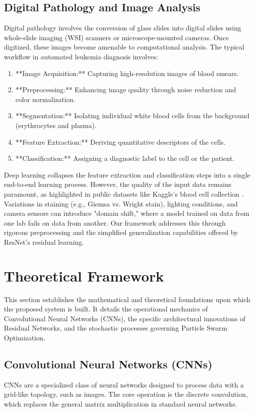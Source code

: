 \documentclass[journal]{IEEEtran}
\begin{document}
\subsection{Digital Pathology and Image Analysis}
Digital pathology involves the conversion of glass slides into digital slides using whole-slide imaging (WSI) scanners or microscope-mounted cameras. Once digitized, these images become amenable to computational analysis. The typical workflow in automated leukemia diagnosis involves:
\begin{enumerate}
    \item **Image Acquisition:** Capturing high-resolution images of blood smears.
    \item **Preprocessing:** Enhancing image quality through noise reduction and color normalization.
    \item **Segmentation:** Isolating individual white blood cells from the background (erythrocytes and plasma).
    \item **Feature Extraction:** Deriving quantitative descriptors of the cells.
    \item **Classification:** Assigning a diagnostic label to the cell or the patient.
\end{enumerate}

Deep learning collapses the feature extraction and classification steps into a single end-to-end learning process. However, the quality of the input data remains paramount, as highlighted in public datasets like Kaggle's blood cell collection \cite{r9}. Variations in staining (e.g., Giemsa vs. Wright stain), lighting conditions, and camera sensors can introduce "domain shift," where a model trained on data from one lab fails on data from another. Our framework addresses this through rigorous preprocessing and the simplified generalization capabilities offered by ResNet's residual learning.

\section{Theoretical Framework}
This section establishes the mathematical and theoretical foundations upon which the proposed system is built. It details the operational mechanics of Convolutional Neural Networks (CNNs), the specific architectural innovations of Residual Networks, and the stochastic processes governing Particle Swarm Optimization.

\subsection{Convolutional Neural Networks (CNNs)}
CNNs are a specialized class of neural networks designed to process data with a grid-like topology, such as images. The core operation is the discrete convolution, which replaces the general matrix multiplication in standard neural networks.
\end{document}
